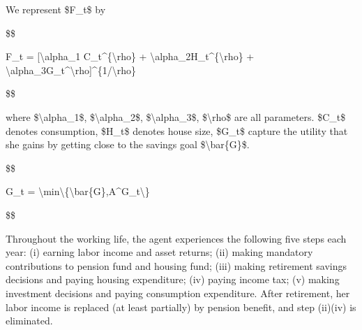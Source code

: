 \documentclass[smallextended]{svjour3}       %
\begin{document}
We represent \$F\_t\$ by

\$\$

F\_t = {[}\textbackslash alpha\_1 C\_t\^{}\{\textbackslash rho\} +
\textbackslash alpha\_2H\_t\^{}\{\textbackslash rho\} +
\textbackslash alpha\_3G\_t\^{}\textbackslash rho{]}\^{}\{1/\textbackslash rho\}

\$\$

where \$\textbackslash alpha\_1\$, \$\textbackslash alpha\_2\$,
\$\textbackslash alpha\_3\$, \$\textbackslash rho\$ are all parameters.
\$C\_t\$ denotes consumption, \$H\_t\$ denotes house size, \$G\_t\$
capture the utility that she gains by getting close to the savings goal
\$\textbackslash bar\{G\}\$.

\$\$

G\_t =
\textbackslash min\textbackslash\{\textbackslash bar\{G\},A\^{}G\_t\textbackslash\}

\$\$

Throughout the working life, the agent experiences the following five
steps each year: (i) earning labor income and asset returns; (ii) making
mandatory contributions to pension fund and housing fund; (iii) making
retirement savings decisions and paying housing expenditure; (iv) paying
income tax; (v) making investment decisions and paying consumption
expenditure. After retirement, her labor income is replaced (at least
partially) by pension benefit, and step (ii)(iv) is eliminated.




\end{document}

